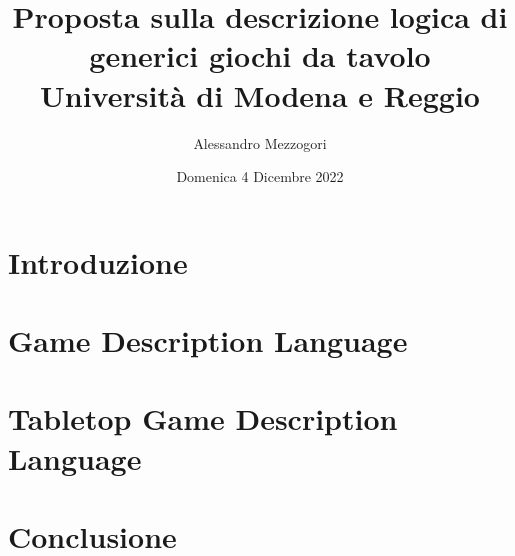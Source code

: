 \documentclass[12pt, oneside]{report}
\title{
    {Proposta sulla descrizione logica  di generici giochi da tavolo} \\
    {\large Università di Modena e Reggio} \\
}
\author{Alessandro Mezzogori}
\date{Domenica 4 Dicembre 2022}
\newcommand{\blankpage}{
    \null
    \thispagestyle{empty}
    \addtocounter{page}{-1}
    \newpage
}
\begin{document}
\maketitle
\blankpage
\tableofcontents

\chapter{Introduzione}


\chapter{Game Description Language}


\chapter{Tabletop Game Description Language}


\chapter{Conclusione}

\end{document}
